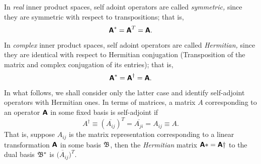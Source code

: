 In {\em real} inner product spaces,
self adoint operators are called {\em symmetric,}
since they are symmetric with respect to transpositions; that is,
\begin{equation}
\textsf{\textbf{A}}^{\ast}= \textsf{\textbf{A}}^{T}=
\textsf{\textbf{A}}.
\end{equation}

In {\em complex} inner product spaces,
self adoint operators are called {\em Hermitian,}
since they are identical with respect to Hermitian conjugation (Transposition of the matrix and complex conjugation of its
entries); that is,
\begin{equation}
\textsf{\textbf{A}}^{\ast}= \textsf{\textbf{A}}^{\dagger}=
\textsf{\textbf{A}}.
\end{equation}

In what follows, we shall consider only the latter case and identify self-adjoint operators with Hermitian ones.
In terms of matrices, a matrix $A$ corresponding to an operator $\textsf{\textbf{A}}$ in
some fixed basis is self-adjoint
if
\begin{equation}
A^{\dagger}\equiv (\overline{A_{ij}})^T=  \overline{A_{ji}} =A_{ij} \equiv A.
\end{equation}
That is, suppose $A_{ij}$ is the matrix representation
corresponding to a linear transformation $\textsf{\textbf{A}}$  in some basis ${\frak B}$,
then the {\em Hermitian} matrix $\textsf{\textbf{A}}\ast = \textsf{\textbf{A}}\dagger$
to the dual basis
${\frak B}^*$
is
$\overline{(A_{ij}})^T$.



